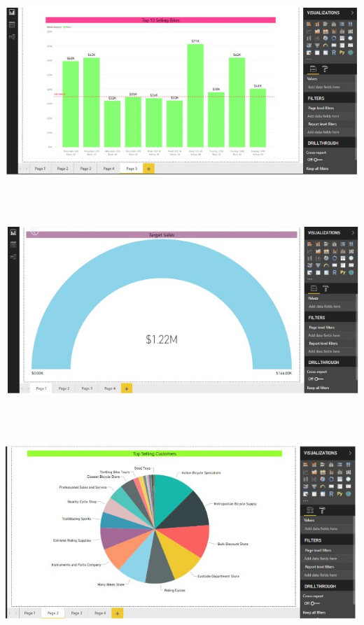 \begin{flushleft}
\begin{itemize}
\textbf{ }\\
\begin{center}
	\includegraphics[width=15cm]{./Imagenes/image34} 
	\end{center}
\textbf{ }\\
\textbf{ }\\
\begin{center}
	\includegraphics[width=15cm]{./Imagenes/image35} 
	\end{center}
\textbf{ }\\
\textbf{ }\\
\begin{center}
	\includegraphics[width=15cm]{./Imagenes/image36} 
	\end{center}

\end{itemize}
\end{flushleft}
